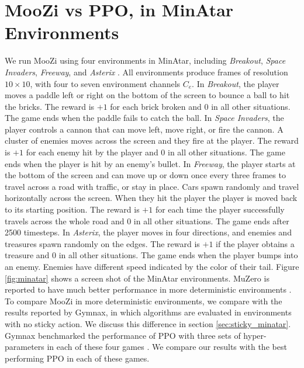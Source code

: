 \section{MooZi vs PPO, in MinAtar Environments} \label{sec:exp:minatar}
We run MooZi using four environments in MinAtar, including \textit{Breakout}, \textit{Space Invaders}, \textit{Freeway}, and \textit{Asterix} \cite{MinAtarAtariInspiredTestbed_Young.Tian_2019}.
All environments produce frames of resolution $10 \times 10$, with four to seven environment channels $C_e$.
In \textit{Breakout}, the player moves a paddle left or right on the bottom of the screen to bounce a ball to hit the bricks.
The reward is $+1$ for each brick broken and $0$ in all other situations.
The game ends when the paddle fails to catch the ball.
In \textit{Space Invaders}, the player controls a cannon that can move left, move right, or fire the cannon.
A cluster of enemies moves across the screen and they fire at the player.
The reward is $+1$ for each enemy hit by the player and $0$ in all other situations.
The game ends when the player is hit by an enemy's bullet.
In \textit{Freeway}, the player starts at the bottom of the screen and can move up or down once every three frames to travel across a road with traffic, or stay in place.
Cars spawn randomly and travel horizontally across the screen.
When they hit the player the player is moved back to its starting position.
The reward is $+1$ for each time the player successfully travels across the whole road and $0$ in all other situations.
The game ends after 2500 timesteps.
In \textit{Asterix}, the player moves in four directions, and enemies and treasures spawn randomly on the edges.
The reward is $+1$ if the player obtains a treasure and $0$ in all other situations.
The game ends when the player bumps into an enemy.
Enemies have different speed indicated by the color of their tail.
Figure \ref{fig:minatar} shows a screen shot of the MinAtar environments.
MuZero is reported to have much better performance in more deterministic environments \cite{VectorQuantizedModels_Ozair.Li.ea_2021}.
To compare MooZi in more deterministic environments, we compare with the results reported by Gymnax, in which algorithms are evaluated in environments with no sticky action.
We discuss this difference in section \ref{sec:sticky_minatar}.
Gymnax benchmarked the performance of PPO with three sets of hyper-parameters in each of these four games \cite{GymnaxJAXbasedReinforcement_RobertTjarkoLange_2022,ProximalPolicyOptimization_Schulman.Wolski.ea_2017}.
We compare our results with the best performing PPO in each of these games.
